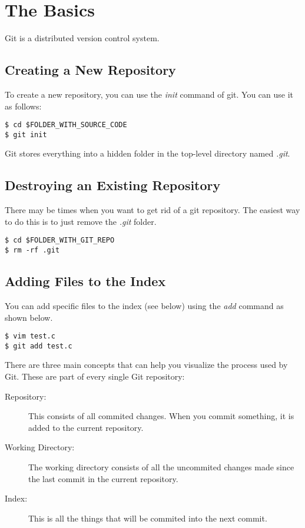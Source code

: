 \chapter{The Basics}

Git is a distributed version control system.

\section{Creating a New Repository}

To create a new repository, you can use the \emph{init} command of git. You 
can use it as follows:

\begin{lstlisting}[label=git-init, caption='Initializing a git repository']
$ cd $FOLDER_WITH_SOURCE_CODE
$ git init
\end{lstlisting}

Git stores everything into a hidden folder in the top-level directory
named \emph{.git}.

\section{Destroying an Existing Repository}

There may be times when you want to get rid of a git repository. The 
easiest way to do this is to just remove the \emph{.git} folder.

\begin{lstlisting}[label=git-destroy, caption='Destroying a git repository']
$ cd $FOLDER_WITH_GIT_REPO
$ rm -rf .git
\end{lstlisting}

\section{Adding Files to the Index}

You can add specific files to the index (see below) using the \emph{add} 
command as shown below.

\begin{lstlisting}[label=git-add, caption='Adding files to a git repository']
$ vim test.c
$ git add test.c
\end{lstlisting}

There are three main concepts that can help you visualize the process
used by Git. These are part of every single Git repository:

\begin{description}
\item[Repository:] This consists of all commited changes. When you
commit something, it is added to the current repository.
\item[Working Directory:] The working directory consists of all the
uncommited changes made since the last commit in the current repository.
\item[Index:] This is all the things that will be commited into the next
commit.
\end{description}

